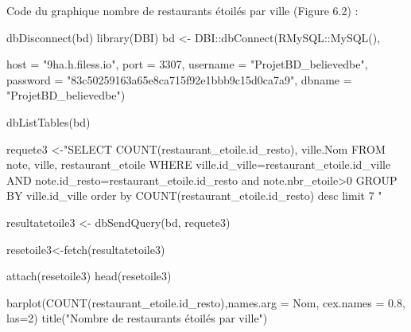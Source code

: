 \documentclass[mstat,12pt]{unswthesis}
\newenvironment{Shaded}{\begin{snugshade}}{\end{snugshade}}
\newcommand{\AttributeTok}[1]{\textcolor[rgb]{0.77,0.63,0.00}{#1}}
\newcommand{\DecValTok}[1]{\textcolor[rgb]{0.00,0.00,0.81}{#1}}
\newcommand{\FloatTok}[1]{\textcolor[rgb]{0.00,0.00,0.81}{#1}}
\newcommand{\FunctionTok}[1]{\textcolor[rgb]{0.00,0.00,0.00}{#1}}
\newcommand{\NormalTok}[1]{#1}
\newcommand{\OtherTok}[1]{\textcolor[rgb]{0.56,0.35,0.01}{#1}}
\newcommand{\SpecialCharTok}[1]{\textcolor[rgb]{0.00,0.00,0.00}{#1}}
\newcommand{\StringTok}[1]{\textcolor[rgb]{0.31,0.60,0.02}{#1}}
\begin{document}
\normalsize
\bigskip

Code du graphique nombre de restaurants étoilés par ville (Figure 6.2) :
\tiny

\begin{Shaded}
\begin{Highlighting}[]
\FunctionTok{dbDisconnect}\NormalTok{(bd)}
\FunctionTok{library}\NormalTok{(DBI)}
\NormalTok{bd }\OtherTok{\textless{}{-}}\NormalTok{ DBI}\SpecialCharTok{::}\FunctionTok{dbConnect}\NormalTok{(RMySQL}\SpecialCharTok{::}\FunctionTok{MySQL}\NormalTok{(),}
                     
                     \AttributeTok{host =} \StringTok{"9ha.h.filess.io"}\NormalTok{, }\AttributeTok{port =} \DecValTok{3307}\NormalTok{,}
                     \AttributeTok{username =} \StringTok{"ProjetBD\_believedbe"}\NormalTok{,}
                     \AttributeTok{password =} \StringTok{"83c50259163a65e8ca715f92e1bbb9c15d0ca7a9"}\NormalTok{,}
                     \AttributeTok{dbname =} \StringTok{"ProjetBD\_believedbe"}\NormalTok{)}

\FunctionTok{dbListTables}\NormalTok{(bd)}

\NormalTok{requete3 }\OtherTok{\textless{}{-}}\StringTok{"SELECT COUNT(restaurant\_etoile.id\_resto), ville.Nom     }
\StringTok{FROM note, ville, restaurant\_etoile             }
\StringTok{WHERE ville.id\_ville=restaurant\_etoile.id\_ville}
\StringTok{AND note.id\_resto=restaurant\_etoile.id\_resto}
\StringTok{and note.nbr\_etoile\textgreater{}0}
\StringTok{GROUP BY ville.id\_ville}
\StringTok{order by COUNT(restaurant\_etoile.id\_resto) desc}
\StringTok{limit 7}
\StringTok{"}

\NormalTok{resultatetoile3 }\OtherTok{\textless{}{-}} \FunctionTok{dbSendQuery}\NormalTok{(bd, requete3)}

\NormalTok{resetoile3}\OtherTok{\textless{}{-}}\FunctionTok{fetch}\NormalTok{(resultatetoile3)}

\FunctionTok{attach}\NormalTok{(resetoile3)}
\FunctionTok{head}\NormalTok{(resetoile3)}

\FunctionTok{barplot}\NormalTok{(}\StringTok{\textasciigrave{}}\AttributeTok{COUNT(restaurant\_etoile.id\_resto)}\StringTok{\textasciigrave{}}\NormalTok{,}\AttributeTok{names.arg =}\NormalTok{ Nom, }\AttributeTok{cex.names =} \FloatTok{0.8}\NormalTok{, }\AttributeTok{las=}\DecValTok{2}\NormalTok{)}
\FunctionTok{title}\NormalTok{(}\StringTok{"Nombre de restaurants étoilés par ville"}\NormalTok{)}
\end{Highlighting}
\end{Shaded}
\end{document}
